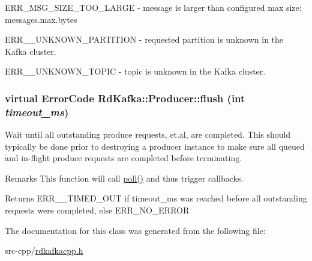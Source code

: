 \begin{DoxyItemize}
\item ERR\_\-MSG\_\-SIZE\_\-TOO\_\-LARGE -\/ message is larger than configured max size: {\ttfamily messages.max.bytes} 
\end{DoxyItemize}


\begin{DoxyItemize}
\item ERR\_\-\_\-UNKNOWN\_\-PARTITION -\/ requested {\ttfamily partition} is unknown in the Kafka cluster.
\end{DoxyItemize}


\begin{DoxyItemize}
\item ERR\_\-\_\-UNKNOWN\_\-TOPIC -\/ topic is unknown in the Kafka cluster. 
\end{DoxyItemize}\hypertarget{classRdKafka_1_1Producer_afa33f8d26eb49f8cc7988397bbb2db42}{
\subsubsection[{flush}]{\setlength{\rightskip}{0pt plus 5cm}virtual ErrorCode RdKafka::Producer::flush (int {\em timeout\_\-ms})}}
\label{classRdKafka_1_1Producer_afa33f8d26eb49f8cc7988397bbb2db42}


Wait until all outstanding produce requests, et.al, are completed. This should typically be done prior to destroying a producer instance to make sure all queued and in-\/flight produce requests are completed before terminating. \begin{DoxyRemark}{Remarks}
This function will call \hyperlink{classRdKafka_1_1Handle_a98d3b4ee48457ff13e4d5155e3fc5ea4}{poll()} and thus trigger callbacks.
\end{DoxyRemark}
\begin{DoxyReturn}{Returns}
ERR\_\-\_\-TIMED\_\-OUT if {\ttfamily timeout\_\-ms} was reached before all outstanding requests were completed, else ERR\_\-NO\_\-ERROR 
\end{DoxyReturn}


The documentation for this class was generated from the following file:\begin{DoxyCompactItemize}
\item 
src-\/cpp/\hyperlink{rdkafkacpp_8h}{rdkafkacpp.h}\end{DoxyCompactItemize}
